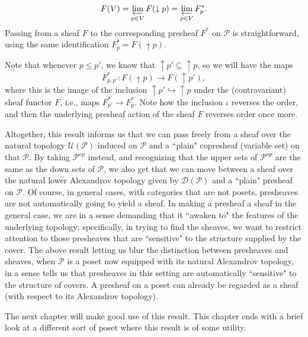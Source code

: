 \documentclass[11pt]{book}
\theoremstyle{definition}
\theoremstyle{definition}
\theoremstyle{definition}
\theoremstyle{theorem}
\theoremstyle{definition}
\begin{document}
\begin{equation*}
F(V) = \varprojlim_{p \in V} F(\downarrow p) = \varprojlim_{p \in V} F^*_p. 
\end{equation*}
Passing from a sheaf $F$ to the corresponding presheaf $F^*$ on $\mathcal{P}$ is straightforward, using the same identification $F^*_p = F(\uparrow p)$. \par 
Note that whenever $p \leq p'$, we know that $\uparrow p' \subseteq  \uparrow p$, so we will have the maps 
\begin{equation*}
F^*_{p, p'}: F(\uparrow p) \rightarrow F(\uparrow p'), 
\end{equation*} where this is the image of the inclusion $\uparrow p' \hookrightarrow \uparrow p$ under the (contravariant) sheaf functor $F$, i.e., maps $F^*_{p'} \rightarrow F^*_{p}$. Note how the inclusion $\iota$ reverses the order, and then the underlying presheaf action of the sheaf $F$ reverses order once more. \par 
Altogether, this result informs us that we can pass freely from a sheaf over the natural topology $\mathcal{U}(\mathcal{P})$ induced on $\mathcal{P}$ and a ``plain" copresheaf (variable set) on that $\mathcal{P}$. By taking $\mathcal{P}^{op}$ instead, and recognizing that the upper sets of $\mathcal{P}^{op}$ are the same as the down sets of $\mathcal{P}$, we also get that we can move between a sheaf over the natural lower Alexandrov topology given by $\mathcal{D}(\mathcal{P})$ and a ``plain" presheaf on $\mathcal{P}$. 
Of course, in general cases, with categories that are not posets, presheaves are not automatically going to yield a sheaf. In making a presheaf a sheaf in the general case, we are in a sense demanding that it ``awaken to" the features of the underlying topology; specifically, in trying to find the sheaves, we want to restrict attention to those presheaves that are ``sensitive" to the structure supplied by the cover. The above result letting us blur the distinction between presheaves and sheaves, when $\mathcal{P}$ is a poset now equipped with its natural Alexandrov topology, in a sense tells us that presheaves in this setting are automatically ``sensitive" to the structure of covers. A presheaf on a poset can already be regarded as a sheaf (with respect to its Alexandrov topology).\par 
The next chapter will make good use of this result. This chapter ends with a brief look at a different sort of poset where this result is of some utility.  
\end{document}
